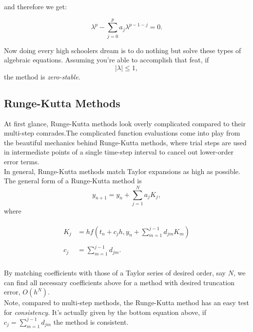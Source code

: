 \documentclass[paper=a4, fontsize=11pt]{scrartcl} %
\numberwithin{equation}{section} %
\numberwithin{figure}{section} %
\numberwithin{table}{section} %
\begin{document}
and therefore we get:

$$\lambda^p - \sum_{j=0}^{p} a_{j} \lambda^{p-1-j} = 0.$$

Now doing every high schoolers dream is to do nothing but solve these types of algebraic equations. Assuming you're able to accomplish that feat, if $$|\lambda| \leq 1,$$ the method is \emph{zero-stable}. \\



%
%
%
%

\subsection{Runge-Kutta Methods}

$ $\\

At first glance, Runge-Kutta methods look overly complicated compared to their multi-step comrades.The complicated function evaluations come into play from the beautiful mechanics behind Runge-Kutta methods, where trial steps are used in intermediate points of a single time-step interval to cancel out lower-order error terms. \\

In general, Runge-Kutta methods match Taylor expansions as high as possible. The general form of a Runge-Kutta method is $$y_{n+1} = y_{n} + \sum_{j=1}^N a_{j} K_{j},$$ where 

\begin{align}
\nonumber
\begin{split}
K_{j} &= h f\left(t_{n}+c_{j}h, y_{n} +\sum_{m=1}^{j-1} d_{jm} K_{m}  \right) \\ \\
c_{j} &= \sum_{m=1}^{j-1} d_{jm}. \\
\end{split}
\end{align}

By matching coefficients with those of a Taylor series of desired order, say $N$, we can find all necessary coefficients above for a method with desired truncation error, $O(h^N)$.\\

Note, compared to multi-step methods, the Runge-Kutta method has an easy test for \emph{consistency}. It's actually given by the bottom equation above, if $c_{j} = \sum_{m=1}^{j-1} d_{jm}$ the method is consistent.
\end{document}
